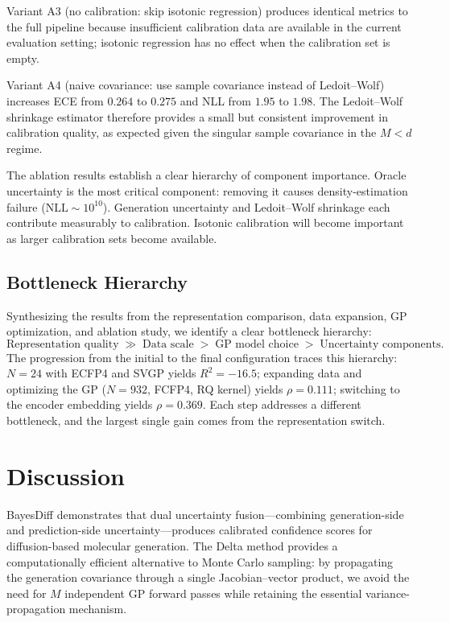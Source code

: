 \documentclass{article}
\begin{document}
Variant A3 (no calibration: skip isotonic regression) produces identical
metrics to the full pipeline because insufficient calibration data are
available in the current evaluation setting; isotonic regression has no
effect when the calibration set is empty.

Variant A4 (naive covariance: use sample covariance instead of
Ledoit--Wolf) increases ECE from $0.264$ to $0.275$ and NLL from $1.95$
to $1.98$.  The Ledoit--Wolf shrinkage estimator therefore provides a
small but consistent improvement in calibration quality, as expected
given the singular sample covariance in the $M < d$ regime.

The ablation results establish a clear hierarchy of component importance.
Oracle uncertainty is the most critical component: removing it causes
density-estimation failure ($\mathrm{NLL} \sim 10^{10}$).  Generation
uncertainty and Ledoit--Wolf shrinkage each contribute measurably to
calibration.  Isotonic calibration will become important as larger
calibration sets become available.

\subsection{Bottleneck Hierarchy}

Synthesizing the results from the representation comparison, data
expansion, GP optimization, and ablation study, we identify a clear
bottleneck hierarchy:
\begin{equation*}
  \text{Representation quality}
  \;\gg\;
  \text{Data scale}
  \;>\;
  \text{GP model choice}
  \;>\;
  \text{Uncertainty components}.
\end{equation*}
The progression from the initial to the final configuration traces this
hierarchy: $N = 24$ with ECFP4 and SVGP yields $R^{2} = -16.5$;
expanding data and optimizing the GP ($N = 932$, FCFP4, RQ kernel) yields
$\rho = 0.111$; switching to the encoder embedding yields
$\rho = 0.369$.  Each step addresses a different bottleneck, and the
largest single gain comes from the representation switch.


\section{Discussion}

BayesDiff demonstrates that dual uncertainty fusion---combining
generation-side and prediction-side uncertainty---produces calibrated
confidence scores for diffusion-based molecular generation.  The Delta
method provides a computationally efficient alternative to Monte Carlo
sampling: by propagating the generation covariance through a single
Jacobian--vector product, we avoid the need for $M$ independent GP
forward passes while retaining the essential variance-propagation
mechanism.
\end{document}
